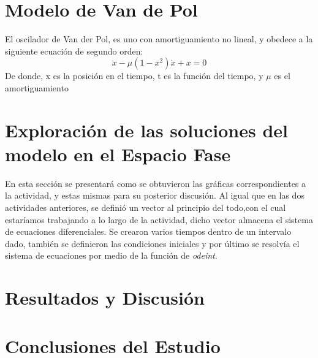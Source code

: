 \documentclass{article}
\begin{document}
\section {Modelo de Van de Pol}
El oscilador de Van der Pol, es uno con amortiguamiento no lineal, y obedece a la siguiente ecuación de segundo orden:
\begin{equation}
\ddot x -\mu (1-x^2) \dot x +x = 0
\end{equation}
De donde, x es la posición en el tiempo, t es la función del tiempo, y $\mu$ es el amortiguamiento

\section {Exploración de las soluciones del modelo en el Espacio Fase}
En esta sección se presentará como se obtuvieron las gráficas correspondientes a la actividad, y estas mismas para su posterior discusión.
Al igual que en las dos actividades anteriores, se definió un vector al principio del todo,con el cual estaríamos trabajando a lo largo de la actividad, dicho vector almacena el sistema de ecuaciones diferenciales. Se crearon varios tiempos dentro de un intervalo dado, también se definieron las condiciones iniciales y por último se resolvía el sistema de ecuaciones por medio de la función de \textit{odeint}.

\section {Resultados y Discusión} 

\section {Conclusiones del Estudio}
\end{document}
